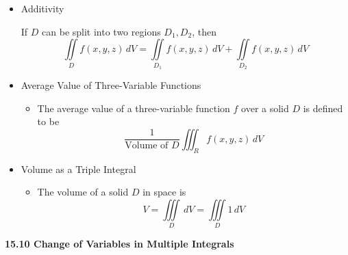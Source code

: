 \documentclass[12pt]{article}
\newcommand{\dvar}[1]{\,d{#1}}
\renewcommand{\d}[1]{\dvar{#1}}
\newcommand{\<}{\left<}
\renewcommand{\>}{\right>}
\begin{document}
\begin{itemize}
  \item Additivity
  
  If $D$ can be split into two regions $D_1,D_2$, then
    \[\iint\limits_D f(x,y,z)\d{V} = \iint\limits_{D_1} f(x,y,z)\d{V} + \iint\limits_{D_2} f(x,y,z)\d{V}\]

  \item Average Value of Three-Variable Functions
    \begin{itemize}
      \item The average value of a three-variable function $f$ over a solid $D$ is defined to be
        \[
          \frac{1}{\text{Volume of }D}\iiint_R f(x,y,z)\d{V}
        \]
    \end{itemize}
  
  \item Volume as a Triple Integral
    
    \begin{itemize}
    \item The volume of a solid $D$ in space is \[V = \iiint\limits_D\,dV=\iiint\limits_D 1\,dV\]
    \end{itemize}
    
  \end{itemize}
  
  \newpage
  
  \centerline{\bf 15.10 Change of Variables in Multiple Integrals}
  
\end{document}

